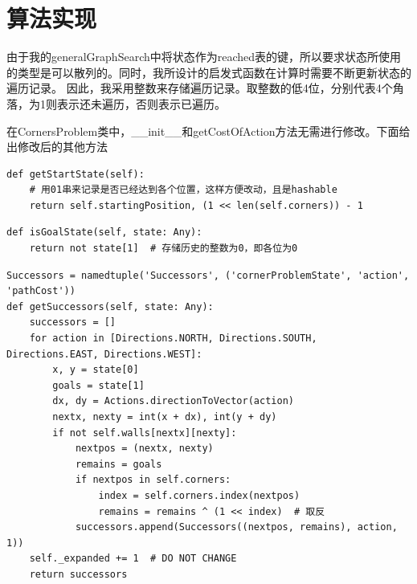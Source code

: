 \section{算法实现}
%
%
由于我的generalGraphSearch中将状态作为reached表的键，所以要求状态所使用的类型是可以散列的。同时，我所设计的启发式函数在计算时需要不断更新状态的遍历记录。
因此，我采用整数来存储遍历记录。取整数的低4位，分别代表4个角落，为1则表示还未遍历，否则表示已遍历。

在CornersProblem类中，\_\_init\_\_和getCostOfAction方法无需进行修改。下面给出修改后的其他方法

\begin{lstlisting}
def getStartState(self):
    # 用01串来记录是否已经达到各个位置，这样方便改动，且是hashable
    return self.startingPosition, (1 << len(self.corners)) - 1
\end{lstlisting}

\begin{lstlisting}[emph={[3]parent,pathCost,problem,heuristic,state},emphstyle={[3]\color{vscode_parametercolor}},emph={[4]SearchProblem,Callable,Node,Actions,Reached,Any},emphstyle={[4]\color{vscode_classcolor}}]
def isGoalState(self, state: Any):
    return not state[1]  # 存储历史的整数为0，即各位为0
\end{lstlisting}

\begin{lstlisting}[emph={[3]parent,pathCost,problem,heuristic,state},emphstyle={[3]\color{vscode_parametercolor}},emph={[4]SearchProblem,Callable,Node,Reached,Any},emphstyle={[4]\color{vscode_classcolor}}]
Successors = namedtuple('Successors', ('cornerProblemState', 'action', 'pathCost'))
def getSuccessors(self, state: Any):
    successors = []
    for action in [Directions.NORTH, Directions.SOUTH, Directions.EAST, Directions.WEST]:
        x, y = state[0]
        goals = state[1]
        dx, dy = Actions.directionToVector(action)
        nextx, nexty = int(x + dx), int(y + dy)
        if not self.walls[nextx][nexty]:
            nextpos = (nextx, nexty)
            remains = goals
            if nextpos in self.corners:
                index = self.corners.index(nextpos)
                remains = remains ^ (1 << index)  # 取反
            successors.append(Successors((nextpos, remains), action, 1))
    self._expanded += 1  # DO NOT CHANGE
    return successors
\end{lstlisting}

